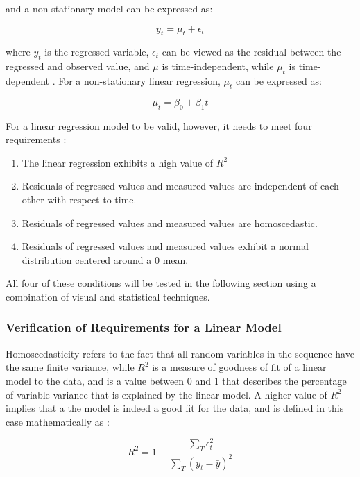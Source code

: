 \documentclass{article}
\begin{document}
and a non-stationary model can be expressed as: 

\begin{equation}
  y_t=\mu_t+\epsilon_t
\end{equation}

where $y_t$ is the regressed variable, $\epsilon_t$ can be viewed as the residual between the regressed and observed value, and $\mu$ is time-independent, while $\mu_t$ is time-dependent \cite{TSAWithR}. For a non-stationary linear regression, $\mu_t$ can be expressed as:

\begin{equation}
  \mu_t=\beta_0+\beta_1t
\end{equation}

For a linear regression model to be valid, however, it needs to meet four requirements \cite{TSAHamilton}: 

\begin{enumerate}[label={(\arabic*)}]
\item The linear regression exhibits a high value of $R^2$ 
\item Residuals of regressed values and measured values are independent of each other with respect to time.
\item Residuals of regressed values and measured values are homoscedastic. 
\item Residuals of regressed values and measured values exhibit a normal distribution centered around a 0 mean.
\end{enumerate}

All four of these conditions will be tested in the following section using a combination of visual and statistical techniques.

\subsubsection{Verification of Requirements for a Linear Model}\label{sec:lm_requirements}

Homoscedasticity refers to the fact that all random variables in the sequence have the same finite variance, while $R^2$ is a measure of goodness of fit of a linear model to the data, and is a value between 0 and 1 that describes the percentage of variable variance that is explained by the linear model. A higher value of $R^2$ implies that a the model is indeed a good fit for the data, and is defined in this case mathematically as \cite{TSAHamilton}:

\begin{equation}
  R^2=1-\frac{\sum\limits_{T}\epsilon_t^2}{\sum\limits_{T}(y_t-\bar{y})^2}
\end{equation}
\end{document}
